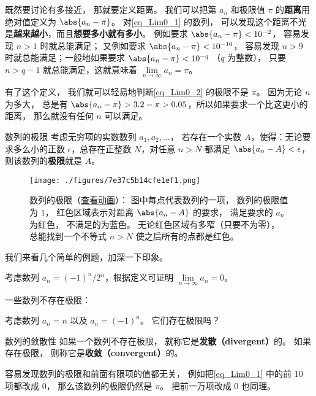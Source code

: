既然要讨论有多接近， 那就要定义距离。 我们可以把第 $a_n$ 和极限值 $\pi$ 的\textbf{距离}用绝对值定义为 $\abs{a_n - \pi}$。 对\autoref{eq_Lim0_1} 的数列， 可以发现这个距离不光是\textbf{越来越小}，而且\textbf{想要多小就有多小}。 例如要求 $\abs{a_n - \pi} < 10^{-2}$， 容易发现 $n > 1$ 时就总能满足； 又例如要求 $\abs{a_n - \pi} < 10^{-10}$， 容易发现 $n > 9$ 时就总能满足；一般地如果要求 $\abs{a_n - \pi} < 10^{-q}$ （$q$ 为整数）， 只要 $n > q-1$ 就总能满足，这就意味着 $\lim\limits_{n \to \infty } a_n = \pi$。

有了这个定义， 我们就可以轻易地判断\autoref{eq_Lim0_2} 的极限不是 $\pi$。 因为无论 $n$ 为多大， 总是有 $\abs{a_n - \pi} > 3.2 - \pi > 0.05$，所以如果要求一个比这更小的距离， 那么就没有任何 $n$ 可以满足。

\begin{definition}{数列的极限}\label{def_Lim0_2}
考虑无穷项的实数数列 $a_1, a_2, \dots$， 若存在一个实数 $A$，使得：无论要求多么小的正数 $\epsilon$，总存在正整数 $N$，对任意 $n > N$ 都满足 $\abs{a_n - A} < \epsilon$， 则该数列的\textbf{极限}就是 $A$。
\end{definition}

\begin{figure}[ht]
\centering
\texttt{[image: ./figures/7e37c5b14cfe1ef1.png]}
\caption{数列的极限（\href{https://wuli.wiki/apps/Lim0.html}{查看动画}）： 图中每点代表数列的一项， 数列的极限值为 $1$， 红色区域表示对距离 $\abs{a_n - A}$ 的要求， 满足要求的 $a_n$ 为红色， 不满足的为蓝色。 无论红色区域有多窄（只要不为零）， 总能找到一个不等式 $n > N$ 使之后所有的点都是红色。} \label{fig_Lim0_1}
\end{figure}

我们来看几个简单的例题，加深一下印象。

\begin{example}{}
考虑数列 $a_n= {(-1)^n}/{2^n}$，根据定义可证明 $\lim\limits_{n\to\infty}a_n=0$。
\end{example}

一些数列不存在极限：
\begin{exercise}{}\label{exe_Lim0_10}
考虑数列 $a_n = n$ 以及 $a_n=(-1)^n$。 它们存在极限吗？
\end{exercise}

\begin{definition}{数列的敛散性}\label{def_Lim0_4}
如果一个数列不存在极限， 就称它是\textbf{发散（divergent）}的。 如果存在极限， 则称它是\textbf{收敛（convergent）}的。
\end{definition}

\begin{example}{}
容易发现数列的极限和前面有限项的值都无关， 例如把\autoref{eq_Lim0_1} 中的前 10 项都改成 $0$， 那么该数列的极限仍然是 $\pi$。 把前一万项改成 $0$ 也同理。
\end{example}

